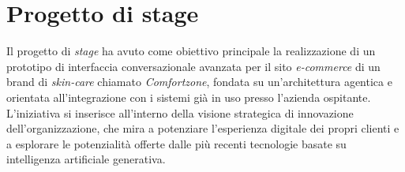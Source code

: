 \section{Progetto di stage}

Il progetto di \emph{stage} ha avuto come obiettivo principale la realizzazione di un prototipo di interfaccia conversazionale avanzata per il sito \emph{e-commerce} di un brand di \emph{skin-care}
chiamato \emph{Comfortzone},
fondata su un’architettura agentica e orientata all’integrazione con i sistemi già in uso presso l’azienda ospitante. 
L’iniziativa si inserisce all’interno della visione strategica di innovazione dell’organizzazione, che mira a potenziare l’esperienza digitale dei propri clienti e a 
esplorare le potenzialità offerte dalle più recenti tecnologie basate su intelligenza artificiale generativa.

